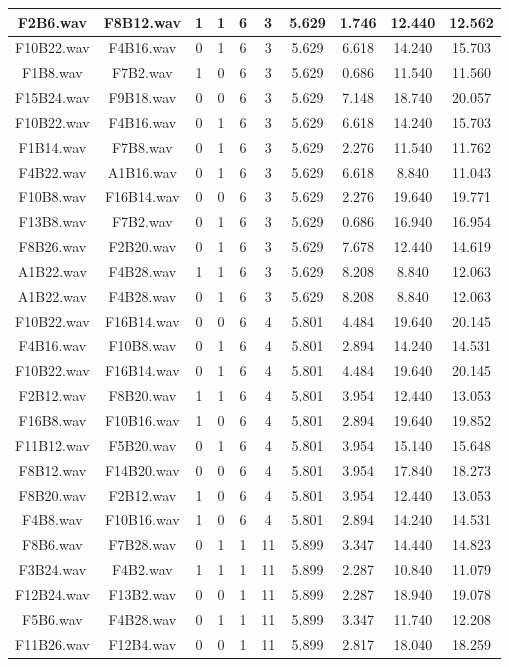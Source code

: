 \documentclass[11pt,a4paper]{book}
\begin{document}
\begin{longtable}[c]{|c|c|c|c|c|c|c|c|c|c|}
F2B6.wav&F8B12.wav&1&1&6&3&5.629&1.746&12.440&12.562\\ \hline
F10B22.wav&F4B16.wav&0&1&6&3&5.629&6.618&14.240&15.703\\ \hline
F1B8.wav&F7B2.wav&1&0&6&3&5.629&0.686&11.540&11.560\\ \hline
F15B24.wav&F9B18.wav&0&0&6&3&5.629&7.148&18.740&20.057\\ \hline
F10B22.wav&F4B16.wav&0&1&6&3&5.629&6.618&14.240&15.703\\ \hline
F1B14.wav&F7B8.wav&0&1&6&3&5.629&2.276&11.540&11.762\\ \hline
F4B22.wav&A1B16.wav&0&1&6&3&5.629&6.618&8.840&11.043\\ \hline
F10B8.wav&F16B14.wav&0&0&6&3&5.629&2.276&19.640&19.771\\ \hline
F13B8.wav&F7B2.wav&0&1&6&3&5.629&0.686&16.940&16.954\\ \hline
F8B26.wav&F2B20.wav&0&1&6&3&5.629&7.678&12.440&14.619\\ \hline
A1B22.wav&F4B28.wav&1&1&6&3&5.629&8.208&8.840&12.063\\ \hline
A1B22.wav&F4B28.wav&0&1&6&3&5.629&8.208&8.840&12.063\\ \hline
F10B22.wav&F16B14.wav&0&0&6&4&5.801&4.484&19.640&20.145\\ \hline
F4B16.wav&F10B8.wav&0&1&6&4&5.801&2.894&14.240&14.531\\ \hline
F10B22.wav&F16B14.wav&0&1&6&4&5.801&4.484&19.640&20.145\\ \hline
F2B12.wav&F8B20.wav&1&1&6&4&5.801&3.954&12.440&13.053\\ \hline
F16B8.wav&F10B16.wav&1&0&6&4&5.801&2.894&19.640&19.852\\ \hline
F11B12.wav&F5B20.wav&0&1&6&4&5.801&3.954&15.140&15.648\\ \hline
F8B12.wav&F14B20.wav&0&0&6&4&5.801&3.954&17.840&18.273\\ \hline
F8B20.wav&F2B12.wav&1&0&6&4&5.801&3.954&12.440&13.053\\ \hline
F4B8.wav&F10B16.wav&1&0&6&4&5.801&2.894&14.240&14.531\\ \hline
F8B6.wav&F7B28.wav&0&1&1&11&5.899&3.347&14.440&14.823\\ \hline
F3B24.wav&F4B2.wav&1&1&1&11&5.899&2.287&10.840&11.079\\ \hline
F12B24.wav&F13B2.wav&0&0&1&11&5.899&2.287&18.940&19.078\\ \hline
F5B6.wav&F4B28.wav&0&1&1&11&5.899&3.347&11.740&12.208\\ \hline
F11B26.wav&F12B4.wav&0&0&1&11&5.899&2.817&18.040&18.259\\ \hline

\end{longtable}
\end{document}
